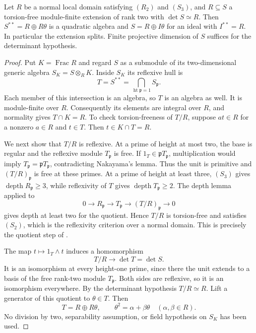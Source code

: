 \begin{theorem}\label{quadratic-order}
Let $R$ be a normal local domain satisfying $(R_2)$ and $(S_3)$, and
$R\subseteq S$ a torsion-free module-finite extension of rank two with
$\det S\simeq R$. Then $S^{**}=R\oplus R\theta$ is a quadratic algebra and
$S=R\oplus I\theta$ for an ideal with $I^{**}=R$. In particular the extension splits. Finite projective dimension of $S$ suffices for the determinant hypothesis.
\end{theorem}
\begin{proof}
Put $K=\operatorname{Frac}R$ and regard $S$ as a submodule
of its two-dimensional generic algebra $S_K=S\otimes_RK$.
Inside $S_K$ its reflexive hull is
\begin{equation}\label{quadratic-reflexive-intersection}
 T=S^{**}=\bigcap_{\operatorname{ht}\mathfrak p=1}S_{\mathfrak p}.
\end{equation}
Each member of this intersection is an algebra, so $T$ is an algebra
as well.  It is module-finite over $R$.  Consequently its elements
are integral over $R$, and normality gives $T\cap K=R$.
To check torsion-freeness of $T/R$, suppose $at\in R$ for a nonzero
$a\in R$ and $t\in T$. Then $t\in K\cap T=R$.

We next show that $T/R$ is reflexive.  At a prime of height at most
two, the base is regular and the reflexive module $T_{\mathfrak p}$
is free. If
$1_T\in\mathfrak pT_{\mathfrak p}$, multiplication would imply
$T_{\mathfrak p}=\mathfrak pT_{\mathfrak p}$, contradicting
Nakayama's lemma. Thus the unit is primitive and $(T/R)_{\mathfrak p}$ is free at these
primes.  At a prime of height at least three, $(S_3)$ gives
$\operatorname{depth}R_{\mathfrak p}\geq3$, while reflexivity of
$T$ gives $\operatorname{depth}T_{\mathfrak p}\geq2$.
The depth lemma applied to
\[
 0\longrightarrow R_{\mathfrak p}\longrightarrow T_{\mathfrak p}
   \longrightarrow(T/R)_{\mathfrak p}\longrightarrow0
\]
gives depth at least two for the quotient.  Hence $T/R$ is
torsion-free and satisfies $(S_2)$, which is the reflexivity
criterion over a normal domain.  This is precisely the quotient
step of \cite[Lemma~2.2]{HM}.

The map $t\mapsto1_T\wedge t$ induces a homomorphism
\[
 T/R\longrightarrow\det T=\det S.
\]
It is an isomorphism at every height-one prime, since there the
unit extends to a basis of the free rank-two module $T_{\mathfrak p}$.
Both sides are reflexive, so it is an isomorphism everywhere.
By the determinant hypothesis $T/R\simeq R$.  Lift a generator
of this quotient to $\theta\in T$.  Then
\begin{equation}\label{quadratic-order-description}
 T=R\oplus R\theta,
 \qquad \theta^2=\alpha+\beta\theta\quad(\alpha,\beta\in R).
\end{equation}
No division by two, separability assumption, or field hypothesis
on $S_K$ has been used.


\end{proof}
